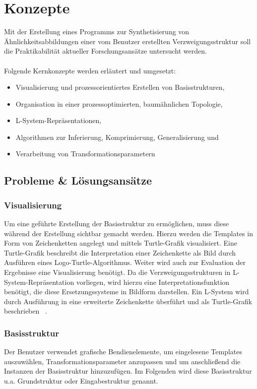 
\chapter{Konzepte}
Mit der Erstellung eines Programms zur Synthetisierung von Ähnlichkeitsabbildungen einer vom Benutzer
erstellten Verzweigungsstruktur soll die Praktikabilität aktueller Forschungsansätze untersucht werden.
\\~\\
Folgende Kernkonzepte werden erläutert und umgesetzt:
\begin{itemize}
    \item Visualisierung und prozessorientiertes Erstellen von Basisstrukturen,
    \item Organisation in einer prozessoptimierten, baumähnlichen Topologie,
    \item L-System-Repräsentationen,
    \item Algorithmen zur Inferierung, Komprimierung, Generalisierung und
    \item Verarbeitung von Transformationsparametern
\end{itemize}

\section{Probleme \& Lösungsansätze}
\label{probleme}

\subsection*{Visualisierung}
Um eine geführte Erstellung der Basisstruktur zu ermöglichen, muss diese während der Erstellung sichtbar gemacht werden.
Hierzu werden die Templates in Form von Zeichenketten angelegt und mittels Turtle-Grafik visualisiert.
Eine Turtle-Grafik beschreibt die Interpretation einer Zeichenkette als Bild durch Ausführen eines Logo-Turtle-Algorithmus.
Weiter wird auch zur Evaluation der Ergebnisse eine Visualisierung benötigt.
Da die Verzweigungsstrukturen in L-System-Repräsentation vorliegen, wird hierzu eine Interpretationsfunktion benötigt,
die diese Ersetzungssysteme in Bildform darstellen.
Ein L-System wird durch Ausführung in eine erweiterte Zeichenkette überführt und als Turtle-Grafik beschrieben
~\cite{prusinkiewicz_1986}.

\subsection*{Basisstruktur}
Der Benutzer verwendet grafische Bendienelemente, um eingelesene Templates auszuwählen, Transformationsparameter anzupassen
und um anschließend die Instanzen der Basisstruktur hinzuzufügen.
Im Folgenden wird diese Basisstruktur u.a. Grundstruktur oder Eingabestruktur genannt.

